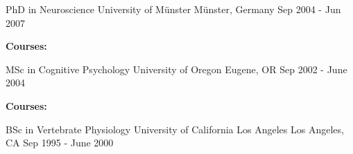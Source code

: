 

\begin{cventries}

  \cventry
    {PhD in Neuroscience} %
    {University of Münster} %
    {Münster, Germany} %
    {Sep 2004 - Jun 2007} %
    {
      \begin{cvitems} %
        \item {}
        \item {}
        \item {\textbf{Courses:} }
      \end{cvitems}
    }
    
  \cventry
    {MSc in Cognitive Psychology} %
    {University of Oregon} %
    {Eugene, OR} %
    {Sep 2002 - June 2004} %
    {
      \begin{cvitems} %
        \item {}
        \item {}
        \item {\textbf{Courses:} }
      \end{cvitems}
    }
    
  \cventry
    {BSc in Vertebrate Physiology} %
    {University of California Los Angeles} %
    {Los Angeles, CA} %
    {Sep 1995 - June 2000} %
    {
      \begin{cvitems} %
        \item {}
        \item {}
      \end{cvitems}
    }
\end{cventries}
